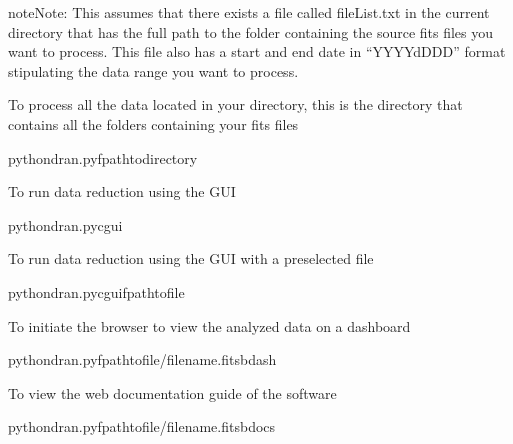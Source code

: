 \documentclass[letterpaper,10pt,english]{sphinxmanual}
\begin{document}
\begin{sphinxadmonition}{note}{Note:}
\sphinxAtStartPar
This assumes that there exists a file called
fileList.txt in the current directory that has the full path
to the folder containing the source fits files you want to
process. This file also has a start and end date in “YYYYdDDD”
format stipulating the data range you want to process.
\end{sphinxadmonition}

\sphinxAtStartPar
To process all the data located in your directory, this is the
directory that contains all the folders containing your fits files

\begin{sphinxVerbatim}[commandchars=\\\{\}]
\PYGZdl{}pythondran.py\PYGZhy{}fpath\PYGZhy{}to\PYGZhy{}directory
\end{sphinxVerbatim}

\sphinxAtStartPar
To run data reduction using the GUI

\begin{sphinxVerbatim}[commandchars=\\\{\}]
\PYGZdl{}pythondran.py\PYGZhy{}cgui
\end{sphinxVerbatim}

\sphinxAtStartPar
To run data reduction using the GUI with a pre\sphinxhyphen{}selected file

\begin{sphinxVerbatim}[commandchars=\\\{\}]
\PYGZdl{}pythondran.py\PYGZhy{}cgui\PYGZhy{}fpath\PYGZhy{}to\PYGZhy{}file
\end{sphinxVerbatim}

\sphinxAtStartPar
To initiate the browser to view the analyzed data on a dashboard

\begin{sphinxVerbatim}[commandchars=\\\{\}]
\PYGZdl{}pythondran.py\PYGZhy{}fpath\PYGZhy{}to\PYGZhy{}file/filename.fits\PYGZhy{}bdash
\end{sphinxVerbatim}

\sphinxAtStartPar
To view the web documentation guide of the software

\begin{sphinxVerbatim}[commandchars=\\\{\}]
\PYGZdl{}pythondran.py\PYGZhy{}fpath\PYGZhy{}to\PYGZhy{}file/filename.fits\PYGZhy{}bdocs
\end{sphinxVerbatim}
\end{document}
